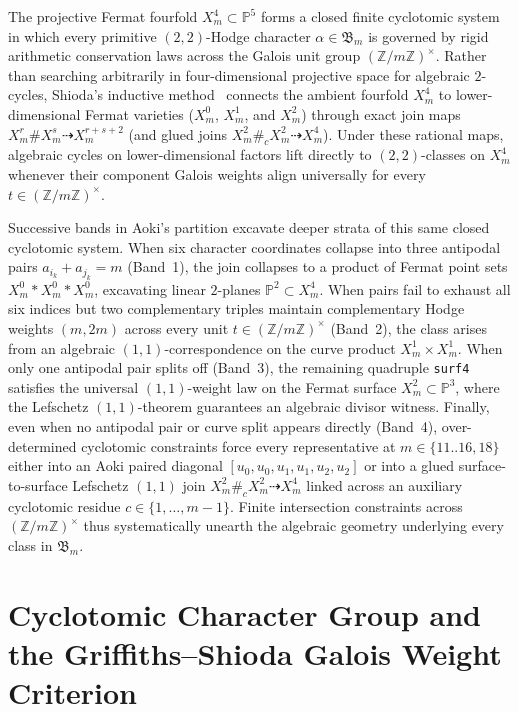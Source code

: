 \documentclass[11pt,a4paper]{article}
\begin{document}
The projective Fermat fourfold $X_m^4 \subset \mathbb{P}^5$ forms a closed finite cyclotomic system in which every primitive $(2,2)$-Hodge character $\alpha \in \mathfrak{B}_m$ is governed by rigid arithmetic conservation laws across the Galois unit group $(\mathbb{Z}/m\mathbb{Z})^\times$. Rather than searching arbitrarily in four-dimensional projective space for algebraic $2$-cycles, Shioda's inductive method~\cite{Shioda1979} connects the ambient fourfold $X_m^4$ to lower-dimensional Fermat varieties ($X_m^0$, $X_m^1$, and $X_m^2$) through exact join maps $X_m^r \# X_m^s \dashrightarrow X_m^{r+s+2}$ (and glued joins $X_m^2 \#_c X_m^2 \dashrightarrow X_m^4$). Under these rational maps, algebraic cycles on lower-dimensional factors lift directly to $(2,2)$-classes on $X_m^4$ whenever their component Galois weights align universally for every $t \in (\mathbb{Z}/m\mathbb{Z})^\times$.

Successive bands in Aoki's partition excavate deeper strata of this same closed cyclotomic system. When six character coordinates collapse into three antipodal pairs $a_{i_k} + a_{j_k} = m$ (Band~1), the join collapses to a product of Fermat point sets $X_m^0 * X_m^0 * X_m^0$, excavating linear $2$-planes $\mathbb{P}^2 \subset X_m^4$. When pairs fail to exhaust all six indices but two complementary triples maintain complementary Hodge weights $(m, 2m)$ across every unit $t \in (\mathbb{Z}/m\mathbb{Z})^\times$ (Band~2), the class arises from an algebraic $(1,1)$-correspondence on the curve product $X_m^1 \times X_m^1$. When only one antipodal pair splits off (Band~3), the remaining quadruple \texttt{surf4} satisfies the universal $(1,1)$-weight law on the Fermat surface $X_m^2 \subset \mathbb{P}^3$, where the Lefschetz $(1,1)$-theorem guarantees an algebraic divisor witness. Finally, even when no antipodal pair or curve split appears directly (Band~4), over-determined cyclotomic constraints force every representative at $m \in \{11..16, 18\}$ either into an Aoki paired diagonal $[u_0,u_0,u_1,u_1,u_2,u_2]$ or into a glued surface-to-surface Lefschetz $(1,1)$ join $X_m^2 \#_c X_m^2 \dashrightarrow X_m^4$ linked across an auxiliary cyclotomic residue $c \in \{1, \dots, m-1\}$. Finite intersection constraints across $(\mathbb{Z}/m\mathbb{Z})^\times$ thus systematically unearth the algebraic geometry underlying every class in $\mathfrak{B}_m$.

\section{Cyclotomic Character Group and the Griffiths--Shioda Galois Weight Criterion}
\end{document}
